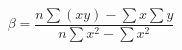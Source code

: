 \begin{equation}
\beta = \frac{n \sum (xy) - \sum x \sum y}{n \sum x^2 - \sum x^2}
\label{formula_linear_regression}
\end{equation}
